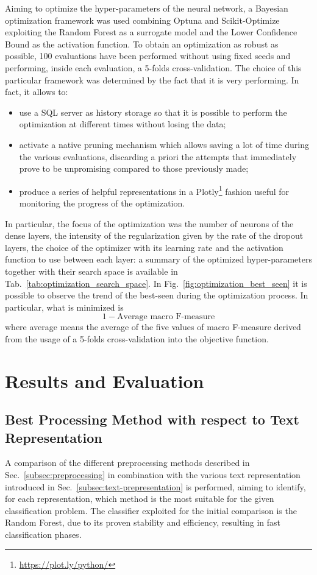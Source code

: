\documentclass[10pt]{article}
\begin{document}
Aiming to optimize the hyper-parameters of the neural network, a Bayesian optimization framework was used combining Optuna and Scikit-Optimize exploiting the Random Forest as a surrogate model and the Lower Confidence Bound as the activation function.
To obtain an optimization as robust as possible, 100 evaluations have been performed without using fixed seeds and performing, inside each evaluation, a 5-folds cross-validation.
The choice of this particular framework was determined by the fact that it is very performing. In fact, it allows to:
\begin{itemize}
\item use a SQL server as history storage so that it is possible to perform the optimization at different times without losing the data;
\item activate a native pruning mechanism which allows saving a lot of time during the various evaluations, discarding a priori the attempts that immediately prove to be unpromising compared to those previously made;
\item produce a series of helpful representations in a Plotly\footnote{\url{https://plot.ly/python/}} fashion useful for monitoring the progress of the optimization.
\end{itemize} 
In particular, the focus of the optimization was the number of neurons of the dense layers, the intensity of the regularization given by the rate of the dropout layers, the choice of the optimizer with its learning rate and the activation function to use between each layer: a summary of the optimized hyper-parameters together with their search space is available in Tab.~\ref{tab:optimization_search_space}.
In Fig.~\ref{fig:optimization_best_seen} it is possible to observe the trend of the best-seen during the optimization process. In particular, what is minimized is
\begin{equation}
1-\text{Average macro F-measure}
\end{equation}
where average means the average of the five values of macro F-measure derived from the usage of a 5-folds cross-validation into the objective function.



\section{Results and Evaluation \label{sec:results}}

\subsection{Best Processing Method with respect to Text Representation}
A comparison of the different preprocessing methods described in Sec.~\ref{subsec:preprocessing} in combination with the various text representation introduced in Sec.~\ref{subsec:text-prepresentation} is performed, aiming to identify, for each representation, which method is the most suitable for the given classification problem. The classifier exploited for the initial comparison is the Random Forest, due to its proven stability and efficiency, resulting in fast classification phases.
\end{document}
